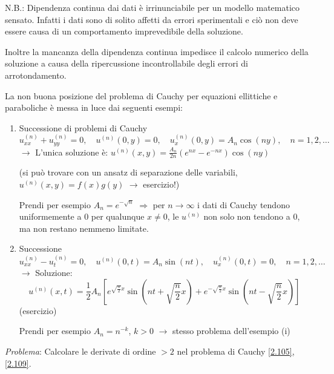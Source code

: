 \documentclass[a4paper,11pt]{report}
\begin{document}
\medskip

N.B.: Dipendenza continua dai dati \`e irrinunciabile per un modello matematico sensato. Infatti i dati sono di solito affetti da errori sperimentali e ci\`o non deve essere causa di un comportamento imprevedibile della soluzione.

Inoltre la mancanza della dipendenza continua impedisce il calcolo numerico della soluzione a causa della ripercussione incontrollabile degli errori di arrotondamento.

\medskip

La non buona posizione del problema di Cauchy per equazioni ellittiche e paraboliche \`e messa in luce dai seguenti esempi:
\begin{enumerate}[label=(\roman*)]
\item Successione di problemi di Cauchy
\[
u_{xx}^{(n)} + u_{yy}^{(n)}=0, \quad u^{(n)}(0,y)=0, \quad u_x^{(n)}(0,y)=A_n\cos(ny), \quad n=1,2,\dots
\]
$\rightarrow$ L'unica soluzione \`e: $u^{(n)}(x,y)=\frac{A_n}{2n}(e^{nx}-e^{-nx})\cos(ny) $

(si pu\`o trovare con un ansatz di separazione delle variabili, $u^{(n)}(x,y)=f(x)g(y)$ $\rightarrow$ esercizio!)

Prendi per esempio $A_n=e^{-\sqrt{n}}$ $\Rightarrow$ per $n\to \infty$ i dati di Cauchy tendono uniformemente a 0 per qualunque $x\neq 0$, le $u^{(n)}$ non solo non tendono a 0, ma non restano nemmeno limitate.
\item Successione 
\[
u_{xx}^{(n)} - u_t^{(n)}=0, \quad u^{(n)}(0,t)=A_n\sin(nt), \quad u_x^{(n)}(0,t)=0, \quad n=1,2,\dots
\]
$\rightarrow$ Soluzione: 
\[
u^{(n)}(x,t) =\frac{1}{2}A_n\left[e^{\sqrt{\frac{n}{2}}x}\sin\left(nt+\sqrt{\frac{n}{2}}x\right) + e^{-\sqrt{\frac{n}{2}}x}\sin\left(nt-\sqrt{\frac{n}{2}}x\right)\right]
\]
(esercizio)

Prendi per esempio $A_n=n^{-k}$, $k>0$ $\rightarrow$ stesso problema dell'esempio (i)
\end{enumerate}

\medskip

\emph{Problema}: Calcolare le derivate di ordine $>2$ nel problema di Cauchy \eqref{2.105}, \eqref{2.109}.
\end{document}
